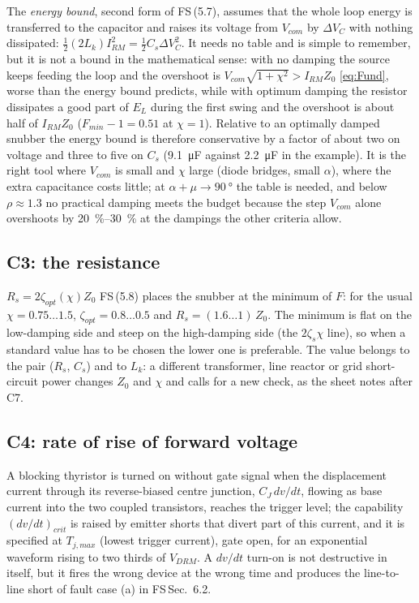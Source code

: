 \documentclass[10pt,a4paper]{scrartcl}
\newcommand{\Lk}{L_{k}}
\newcommand{\VDRM}{V_{DRM}}
\newcommand{\fs}[1]{\textsf{FS}\,(#1)}
\newcommand{\fssec}[1]{\textsf{FS}\,Sec.~#1}
\begin{document}
The \emph{energy bound}, second form of \fs{5.7}, assumes that the whole loop energy is transferred to the capacitor and raises its voltage from $V_{com}$ by $\Delta V_C$ with nothing dissipated: $\tfrac12(2\Lk)I_{RM}^2 = \tfrac12C_s\Delta V_C^2$. It needs no table and is simple to remember, but it is not a bound in the mathematical sense: with no damping the source keeps feeding the loop and the overshoot is $V_{com}\sqrt{1+\chi^2} > I_{RM}Z_0$ \eqref{eq:Fund}, worse than the energy bound predicts, while with optimum damping the resistor dissipates a good part of $E_L$ during the first swing and the overshoot is about half of $I_{RM}Z_0$ ($F_{min}-1 = 0.51$ at $\chi = 1$). Relative to an optimally damped snubber the energy bound is therefore conservative by a factor of about two on voltage and three to five on $C_s$ (\SI{9.1}{\micro F} against \SI{2.2}{\micro F} in the example). It is the right tool where $V_{com}$ is small and $\chi$ large (diode bridges, small $\alpha$), where the extra capacitance costs little; at $\alpha+\mu\to\SI{90}{\degree}$ the table is needed, and below $\rho\approx1.3$ no practical damping meets the budget because the step $V_{com}$ alone overshoots by \SIrange{20}{30}{\percent} at the dampings the other criteria allow.

\subsection{C3: the resistance}
$R_s = 2\zeta_{opt}(\chi)Z_0$ \fs{5.8} places the snubber at the minimum of $F$: for the usual $\chi = 0.75\ldots1.5$, $\zeta_{opt} = 0.8\ldots0.5$ and $R_s = (1.6\ldots1)\,Z_0$. The minimum is flat on the low-damping side and steep on the high-damping side (the $2\zeta_s\chi$ line), so when a standard value has to be chosen the lower one is preferable. The value belongs to the pair ($R_s$, $C_s$) and to $\Lk$: a different transformer, line reactor or grid short-circuit power changes $Z_0$ and $\chi$ and calls for a new check, as the sheet notes after C7.

\subsection{C4: rate of rise of forward voltage}\label{sec:C4}
A blocking thyristor is turned on without gate signal when the displacement current through its reverse-biased centre junction, $C_J\,dv/dt$, flowing as base current into the two coupled transistors, reaches the trigger level; the capability $(dv/dt)_{crit}$ is raised by emitter shorts that divert part of this current, and it is specified at $T_{j,max}$ (lowest trigger current), gate open, for an exponential waveform rising to two thirds of $\VDRM$. A $dv/dt$ turn-on is not destructive in itself, but it fires the wrong device at the wrong time and produces the line-to-line short of fault case (a) in \fssec{6.2}.
\end{document}
